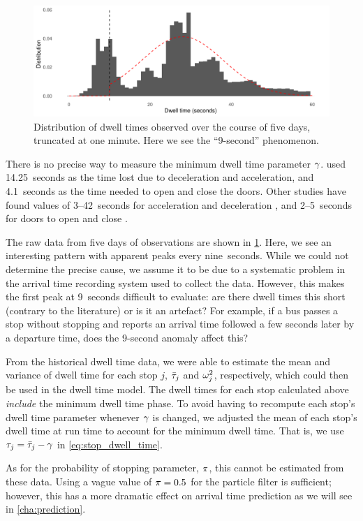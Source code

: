 \begin{knitrout}\small
{}\color{fgcolor}\begin{figure}
\includegraphics[width=\linewidth]{figure/observed_dwell-1} \caption[Distribution of dwell times at stops and the ``9-second'' phenomenon]{Distribution of dwell times observed over the course of five days, truncated at one minute. Here we see the ``9-second'' phenomenon.}\label{fig:observed_dwell}
\end{figure}


\end{knitrout}

There is no precise way to measure the minimum dwell time parameter $\gamma$. \citet{Hans_2015} used 14.25~seconds as the time lost due to deceleration and acceleration, and 4.1~seconds as the time needed to open and close the doors. Other studies have found values of 3--42~seconds for acceleration and deceleration \citep{Robinson_2013}, and 2--5~seconds for doors to open and close \citep{Meng_2013}.



The raw data from five days of observations are shown in \cref{fig:observed_dwell}. Here, we see an interesting pattern with apparent peaks every nine~seconds. While we could not determine the precise cause, we assume it to be due to a systematic problem in the arrival time recording system used to collect the data. However, this makes the first peak at 9~seconds difficult to evaluate: are there dwell times this short (contrary to the literature) or is it an artefact? For example, if a bus passes a stop without stopping and reports an arrival time followed a few seconds later by a departure time, does the 9-second anomaly affect this?

From the historical dwell time data, we were able to estimate the mean and variance of dwell time for each stop $j$, $\bar{\tau}_j$ and $\omega^2_j$, respectively, which could then be used in the dwell time model. The dwell times for each stop calculated above \emph{include} the minimum dwell time phase. To avoid having to recompute each stop's dwell time parameter whenever $\gamma$ is changed, we adjusted the mean of each stop's dwell time at run time to account for the minimum dwell time. That is, we use $\tau_j = \bar{\tau}_j - \gamma$ in \cref{eq:stop_dwell_time}.

As for the probability of stopping parameter, $\pi$, this cannot be estimated from these data. Using a vague value of $\pi=0.5$ for the particle filter is sufficient; however, this has a more dramatic effect on arrival time prediction as we will see in \cref{cha:prediction}.
